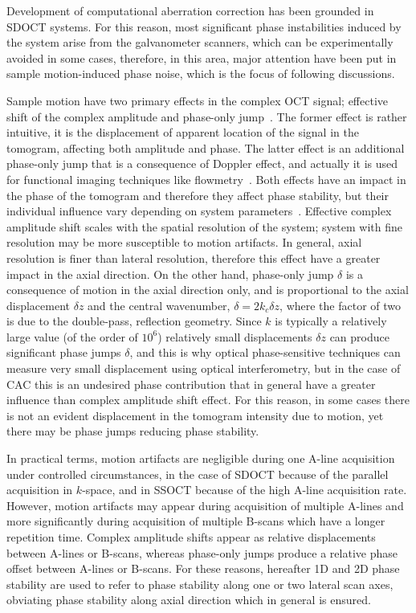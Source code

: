 Development of computational aberration correction has been grounded in SDOCT systems. For this reason, most significant phase instabilities induced by the system arise from the galvanometer scanners, which can be experimentally avoided in some cases, therefore, in this area, major attention have been put in sample motion-induced phase noise, which is the focus of following discussions.

Sample motion have two primary effects in the complex OCT signal; effective shift of the complex amplitude and phase-only jump~\cite{Chen1997_Optical, White2003_vivo, Shemonski2014_Stability}. The former effect is rather intuitive, it is the displacement of apparent location of the signal in the tomogram, affecting both amplitude and phase. The latter effect is an additional phase-only jump that is a consequence of Doppler effect, and actually it is used for functional imaging techniques like flowmetry~\cite{Braaf2019_OCTBased}. Both effects have an impact in the phase of the tomogram and therefore they affect phase stability, but their individual influence vary depending on system parameters~\cite{Shemonski2014_Stability}. Effective complex amplitude shift scales with the spatial resolution of the system; system with fine resolution may be more susceptible to motion artifacts. In general, axial resolution is finer than lateral resolution, therefore this effect have a greater impact in the axial direction. On the other hand, phase-only jump $\delta$ is a consequence of motion in the axial direction only, and is proportional to the axial displacement $\delta z$ and the central wavenumber, $\delta = 2k_c\delta z$, where the factor of two is due to the double-pass, reflection geometry. Since $k$ is typically a relatively large value (of the order of $10^6$) relatively small displacements $\delta z$ can produce significant phase jumps $\delta$, and this is why optical phase-sensitive techniques can measure very small displacement using optical interferometry, but in the case of CAC this is an undesired phase contribution that in general have a greater influence than complex amplitude shift effect. For this reason, in some cases there is not an evident displacement in the tomogram intensity due to motion, yet there may be phase jumps reducing phase stability.

In practical terms, motion artifacts are negligible during one A-line acquisition under controlled circumstances, in the case of SDOCT because of the parallel acquisition in $k$-space, and in SSOCT because of the high A-line acquisition rate. However, motion artifacts may appear during acquisition of multiple A-lines and more significantly during acquisition of multiple B-scans which have a longer repetition time. Complex amplitude shifts appear as relative displacements between A-lines or B-scans, whereas phase-only jumps produce a relative phase offset between A-lines or B-scans. For these reasons, hereafter 1D and 2D phase stability are used to refer to phase stability along one or two lateral scan axes, obviating phase stability along axial direction which in general is ensured.

